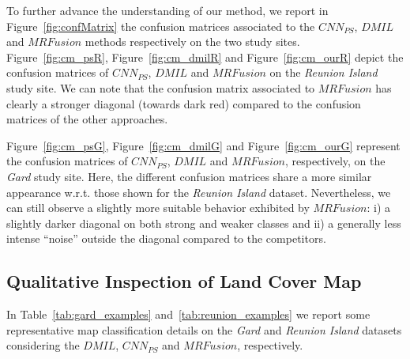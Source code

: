 \documentclass[journal]{IEEEtran}
\newcommand{\method}{$MRFusion$}
\begin{document}
\begin{figure*}[!ht]
\centering
{}
\newline
{}
\caption{Confusion matrices of the Deep Learning approaches on the \textit{Reunion Island} dataset ( $CNN_{PS}$ (a),  $DMIL$ (b) and \method{} (c) ) and on the \textit{Gard} dataset ( $CNN_{PS}$ (d), $DMIL$ (e) and \method{} (f) ).}
\label{fig:confMatrix}
\end{figure*}To further advance the understanding of our method, we report in Figure~\ref{fig:confMatrix} the confusion matrices associated to the $CNN_{PS}$, $DMIL$ and \method{} methods respectively on the two study sites.
Figure~\ref{fig:cm_psR}, Figure~\ref{fig:cm_dmilR} and Figure~\ref{fig:cm_ourR} depict the confusion matrices of $CNN_{PS}$, $DMIL$ and \method{} on the \textit{Reunion Island} study site. We can note that the confusion matrix associated to \method{} has clearly a stronger diagonal (towards dark red) compared to the confusion matrices of the other approaches. %

Figure~\ref{fig:cm_psG}, Figure~\ref{fig:cm_dmilG} and Figure~\ref{fig:cm_ourG} represent the confusion matrices of $CNN_{PS}$, $DMIL$ and \method{}, respectively, on the \textit{Gard} study site. Here, the different confusion matrices share a more similar appearance w.r.t. those shown for the \textit{Reunion Island} dataset. Nevertheless, we can still observe a slightly more suitable behavior exhibited by \method: i) a slightly darker diagonal on both strong and weaker classes and ii) a generally less intense ``noise'' outside the diagonal compared to the competitors.

\subsection{Qualitative Inspection of Land Cover Map}
In Table~\ref{tab:gard_examples} and~\ref{tab:reunion_examples} we report some representative map classification details on the \textit{Gard} and \textit{Reunion Island} datasets considering the $DMIL$, $CNN_{PS}$ and \method, respectively. 
\end{document}
